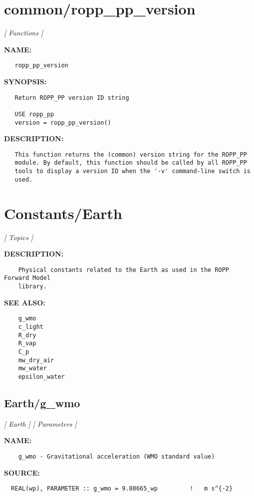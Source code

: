 \section{common/ropp\_pp\_version}
\textsl{[ Functions ]}

\label{ch:robo4}
\label{ch:common_ropp_pp_version}
\textbf{NAME:}\hspace{0.08in}\begin{Verbatim}
   ropp_pp_version
\end{Verbatim}
\textbf{SYNOPSIS:}\hspace{0.08in}\begin{Verbatim}
   Return ROPP_PP version ID string

   USE ropp_pp
   version = ropp_pp_version()
\end{Verbatim}
\textbf{DESCRIPTION:}\hspace{0.08in}\begin{Verbatim}
   This function returns the (common) version string for the ROPP_PP
   module. By default, this function should be called by all ROPP_PP
   tools to display a version ID when the '-v' command-line switch is
   used.
\end{Verbatim}
\section{Constants/Earth}
\textsl{[ Topics ]}

\label{ch:robo5}
\label{ch:Constants_Earth}
\textbf{DESCRIPTION:}\hspace{0.08in}\begin{Verbatim}
    Physical constants related to the Earth as used in the ROPP Forward Model
    library. 
\end{Verbatim}
\textbf{SEE ALSO:}\hspace{0.08in}\begin{Verbatim}
    g_wmo
    c_light
    R_dry
    R_vap
    C_p
    mw_dry_air
    mw_water
    epsilon_water
\end{Verbatim}
\subsection{Earth/g\_wmo}
\textsl{[ Earth ]}
\textsl{[ Parameters ]}

\label{ch:robo12}
\label{ch:Earth_g_wmo}
\textbf{NAME:}\hspace{0.08in}\begin{Verbatim}
    g_wmo - Gravitational acceleration (WMO standard value)
\end{Verbatim}
\textbf{SOURCE:}\hspace{0.08in}\begin{Verbatim}
  REAL(wp), PARAMETER :: g_wmo = 9.80665_wp         !   m s^{-2}
\end{Verbatim}
